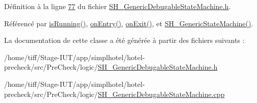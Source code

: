Définition à la ligne \hyperlink{SH__GenericDebugableStateMachine_8h_source_l00077}{77} du fichier \hyperlink{SH__GenericDebugableStateMachine_8h_source}{S\-H\-\_\-\-Generic\-Debugable\-State\-Machine.\-h}.



Référencé par \hyperlink{classSH__GenericStateMachine_a7e650d582a4c1b8cf2869fb5873b36a9}{is\-Running()}, \hyperlink{classSH__GenericStateMachine_adfd82f2532595ed7c4bcf21f03cbb951}{on\-Entry()}, \hyperlink{classSH__GenericStateMachine_a4b36d60fa1876908493d3d07f191a30f}{on\-Exit()}, et \hyperlink{classSH__GenericStateMachine_ac34a1ac375e680e27708097c4f099f59}{S\-H\-\_\-\-Generic\-State\-Machine()}.



La documentation de cette classe a été générée à partir des fichiers suivants \-:\begin{DoxyCompactItemize}
\item 
/home/tiff/\-Stage-\/\-I\-U\-T/app/simplhotel/hotel-\/precheck/src/\-Pre\-Check/logic/\hyperlink{SH__GenericDebugableStateMachine_8h}{S\-H\-\_\-\-Generic\-Debugable\-State\-Machine.\-h}\item 
/home/tiff/\-Stage-\/\-I\-U\-T/app/simplhotel/hotel-\/precheck/src/\-Pre\-Check/logic/\hyperlink{SH__GenericDebugableStateMachine_8cpp}{S\-H\-\_\-\-Generic\-Debugable\-State\-Machine.\-cpp}\end{DoxyCompactItemize}
